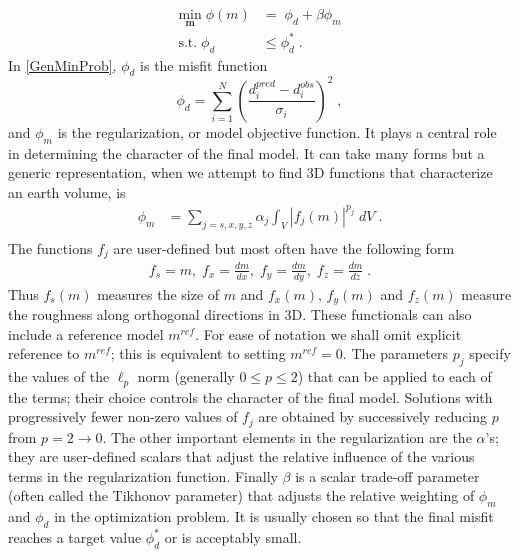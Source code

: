 \documentclass[extra,referee]{gji}
\begin{document}
\begin{equation}
\begin{split}\label{GenMinProb}
\underset{\mathbf{m}}{\text{min}}\; \phi(m) & = \; \phi_d + \beta \phi_m \\
\text{s.t.} \; \phi_d & \leq \phi_d^* \; .
\end{split}
\end{equation}
In \eqref{GenMinProb}, $\phi_d$ is the misfit function
\begin{equation}\label{eq:misfit}
\phi_d =\sum_{i=1}^{N}\left(\frac{d_i^{pred} - {d}_i^{obs}}{\sigma_i}\right)^2 \;,
\end{equation}
and $\phi_m$ is the regularization, or model objective function. It plays a central role in determining the character of the final model. It can take many forms but a generic representation, when we attempt to find 3D functions that characterize an earth volume, is
\begin{equation}
\begin{split}\label{intSmall}
\phi_m &= \sum_{j=s,x,y,z} \alpha_j \int_V |f_j (m)|^{p_j} \;dV\;. \\
\end{split}
\end{equation}
The functions $f_j$ are user-defined but most often have the following form
\begin{equation}
\begin{split}\label{fj}
f_s= m,\;f_x= \frac{d m}{dx},\; f_y= \frac{d m}{dy},\;f_z= \frac{d m}{dz}\;.
\end{split}
\end{equation}
Thus $f_s(m)$ measures the size of $m$ and $f_x(m)$, $f_y(m)$ and $f_z(m)$ measure the roughness along orthogonal directions in 3D. These functionals can also include a reference model $m^{ref}$. For ease of notation we shall omit explicit reference to $m^{ref}$; this is equivalent to setting $m^{ref}=0$. The parameters $p_j$ specify the values of the $\ell_p$ norm (generally $0 \leq p \leq 2$) that can be applied to each of the terms; their choice controls the character of the final model. Solutions with progressively fewer non-zero values of $f_j$ are obtained by successively reducing $p$ from $p=2 \rightarrow 0$. The other important elements in the regularization are the $\alpha$'s; they are user-defined scalars that adjust the relative influence of the various terms in the regularization function.
Finally $\beta$ is a scalar trade-off parameter (often called the Tikhonov parameter) that adjusts the relative weighting of $\phi_m$ and $\phi_d$ in the optimization problem. It is usually chosen so that the final misfit reaches a target value $\phi_d^*$ or is acceptably small.
\end{document}
